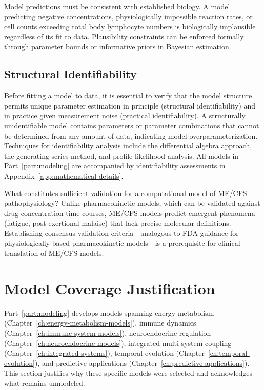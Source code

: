 Model predictions must be consistent with established biology. A model predicting negative concentrations, physiologically impossible reaction rates, or cell counts exceeding total body lymphocyte numbers is biologically implausible regardless of its fit to data. Plausibility constraints can be enforced formally through parameter bounds or informative priors in Bayesian estimation.

\subsection{Structural Identifiability}

Before fitting a model to data, it is essential to verify that the model structure permits unique parameter estimation in principle (structural identifiability) and in practice given measurement noise (practical identifiability). A structurally unidentifiable model contains parameters or parameter combinations that cannot be determined from any amount of data, indicating model overparameterization. Techniques for identifiability analysis include the differential algebra approach, the generating series method, and profile likelihood analysis. All models in Part~\ref{part:modeling} are accompanied by identifiability assessments in Appendix~\ref{app:mathematical-details}.

\begin{open_question}
What constitutes sufficient validation for a computational model of ME/CFS pathophysiology? Unlike pharmacokinetic models, which can be validated against drug concentration time courses, ME/CFS models predict emergent phenomena (fatigue, post-exertional malaise) that lack precise molecular definitions. Establishing consensus validation criteria---analogous to FDA guidance for physiologically-based pharmacokinetic models---is a prerequisite for clinical translation of ME/CFS models.
\end{open_question}

\section{Model Coverage Justification}
\label{sec:model-coverage}

Part~\ref{part:modeling} develops models spanning energy metabolism (Chapter~\ref{ch:energy-metabolism-models}), immune dynamics (Chapter~\ref{ch:immune-system-models}), neuroendocrine regulation (Chapter~\ref{ch:neuroendocrine-models}), integrated multi-system coupling (Chapter~\ref{ch:integrated-systems}), temporal evolution (Chapter~\ref{ch:temporal-evolution}), and predictive applications (Chapter~\ref{ch:predictive-applications}). This section justifies why these specific models were selected and acknowledges what remains unmodeled.

